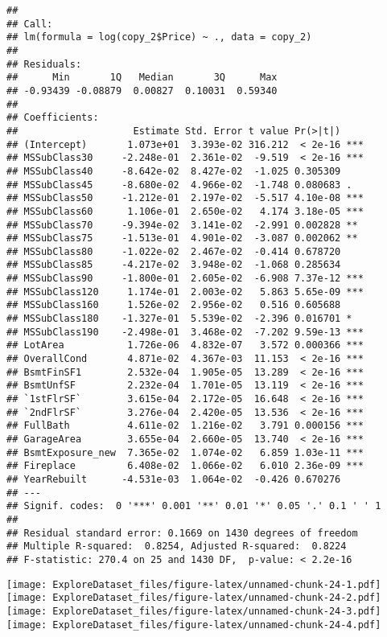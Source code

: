 \documentclass[]{article}
\begin{document}
\begin{verbatim}
## 
## Call:
## lm(formula = log(copy_2$Price) ~ ., data = copy_2)
## 
## Residuals:
##      Min       1Q   Median       3Q      Max 
## -0.93439 -0.08879  0.00827  0.10031  0.59340 
## 
## Coefficients:
##                    Estimate Std. Error t value Pr(>|t|)    
## (Intercept)       1.073e+01  3.393e-02 316.212  < 2e-16 ***
## MSSubClass30     -2.248e-01  2.361e-02  -9.519  < 2e-16 ***
## MSSubClass40     -8.642e-02  8.427e-02  -1.025 0.305309    
## MSSubClass45     -8.680e-02  4.966e-02  -1.748 0.080683 .  
## MSSubClass50     -1.212e-01  2.197e-02  -5.517 4.10e-08 ***
## MSSubClass60      1.106e-01  2.650e-02   4.174 3.18e-05 ***
## MSSubClass70     -9.394e-02  3.141e-02  -2.991 0.002828 ** 
## MSSubClass75     -1.513e-01  4.901e-02  -3.087 0.002062 ** 
## MSSubClass80     -1.022e-02  2.467e-02  -0.414 0.678720    
## MSSubClass85     -4.217e-02  3.948e-02  -1.068 0.285634    
## MSSubClass90     -1.800e-01  2.605e-02  -6.908 7.37e-12 ***
## MSSubClass120     1.174e-01  2.003e-02   5.863 5.65e-09 ***
## MSSubClass160     1.526e-02  2.956e-02   0.516 0.605688    
## MSSubClass180    -1.327e-01  5.539e-02  -2.396 0.016701 *  
## MSSubClass190    -2.498e-01  3.468e-02  -7.202 9.59e-13 ***
## LotArea           1.726e-06  4.832e-07   3.572 0.000366 ***
## OverallCond       4.871e-02  4.367e-03  11.153  < 2e-16 ***
## BsmtFinSF1        2.532e-04  1.905e-05  13.289  < 2e-16 ***
## BsmtUnfSF         2.232e-04  1.701e-05  13.119  < 2e-16 ***
## `1stFlrSF`        3.615e-04  2.172e-05  16.648  < 2e-16 ***
## `2ndFlrSF`        3.276e-04  2.420e-05  13.536  < 2e-16 ***
## FullBath          4.611e-02  1.216e-02   3.791 0.000156 ***
## GarageArea        3.655e-04  2.660e-05  13.740  < 2e-16 ***
## BsmtExposure_new  7.365e-02  1.074e-02   6.859 1.03e-11 ***
## Fireplace         6.408e-02  1.066e-02   6.010 2.36e-09 ***
## YearRebuilt      -4.531e-03  1.064e-02  -0.426 0.670276    
## ---
## Signif. codes:  0 '***' 0.001 '**' 0.01 '*' 0.05 '.' 0.1 ' ' 1
## 
## Residual standard error: 0.1669 on 1430 degrees of freedom
## Multiple R-squared:  0.8254, Adjusted R-squared:  0.8224 
## F-statistic: 270.4 on 25 and 1430 DF,  p-value: < 2.2e-16
\end{verbatim}

\texttt{[image: ExploreDataset\_files/figure-latex/unnamed-chunk-24-1.pdf]}
\texttt{[image: ExploreDataset\_files/figure-latex/unnamed-chunk-24-2.pdf]}
\texttt{[image: ExploreDataset\_files/figure-latex/unnamed-chunk-24-3.pdf]}
\texttt{[image: ExploreDataset\_files/figure-latex/unnamed-chunk-24-4.pdf]}
\end{document}
